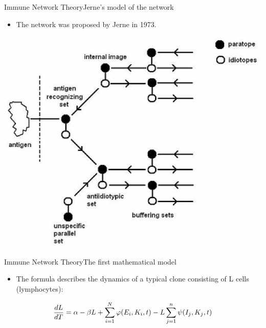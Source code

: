 \begin{frame}{Immune Network Theory}{Jerne's model of the network}
  \begin{itemize}
  \item \large
     The network was proposed by Jerne in 1973.
  \end{itemize}
  \par
  \centering
    \includegraphics[scale=0.5] {img/network_model_jerne.png}
  \par
\end{frame}

\begin{frame}{Immune Network Theory}{The first mathematical model}
  \begin{itemize}
  \item \large
     The formula describes the dynamics of a typical clone consisting of L cells (lymphocytes):
  \end{itemize}
  \begin{equation} \large{
     \frac{dL}{dT}= \alpha -\beta L+\sum_{i=1}^{N}\varphi (E_{i},K_{i},t)-L\sum_{j=1}^{n}\psi (I_{j},K_{j},t)}
  \end{equation}
\end{frame}

